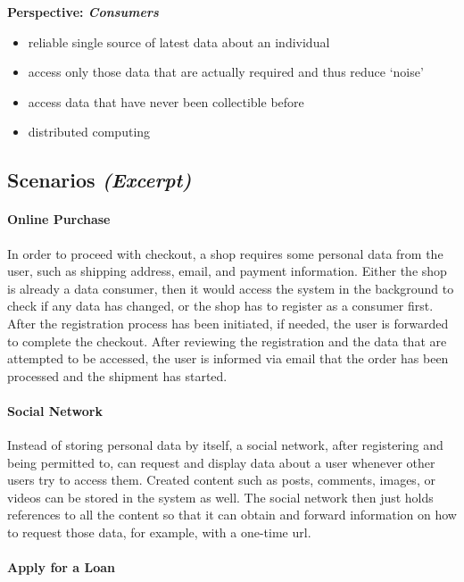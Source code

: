 \documentclass[12pt,english,a4paper,titlepage,cleardoublepage=empty,dottedtoc]{report}
\providecommand{\tightlist}{%
  \setlength{\itemsep}{0pt}\setlength{\parskip}{0pt}}
\begin{document}
\textbf{Perspective: \emph{Consumers}}

\begin{itemize}
\tightlist
\item
  reliable single source of latest data about an individual
\item
  access only those data that are actually required and thus reduce
  `noise'
\item
  access data that have never been collectible before
\item
  distributed computing
\end{itemize}

\subsection{\texorpdfstring{Scenarios
\emph{(Excerpt)}}{Scenarios (Excerpt)}}\label{scenarios-excerpt}

\paragraph{Online Purchase}\label{online-purchase}

In order to proceed with checkout, a shop requires some personal data
from the user, such as shipping address, email, and payment information.
Either the shop is already a data consumer, then it would access the
system in the background to check if any data has changed, or the shop
has to register as a consumer first. After the registration process has
been initiated, if needed, the user is forwarded to complete the
checkout. After reviewing the registration and the data that are
attempted to be accessed, the user is informed via email that the order
has been processed and the shipment has started.

\paragraph{Social Network}\label{social-network}

Instead of storing personal data by itself, a social network, after
registering and being permitted to, can request and display data about a
user whenever other users try to access them. Created content such as
posts, comments, images, or videos can be stored in the system as well.
The social network then just holds references to all the content so that
it can obtain and forward information on how to request those data, for
example, with a one-time url.

\paragraph{Apply for a Loan}\label{apply-for-a-loan}
\end{document}
